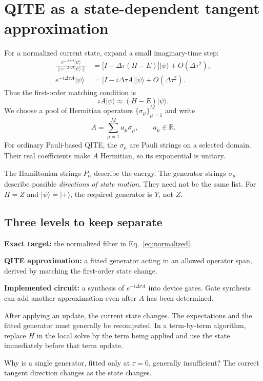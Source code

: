 \documentclass[11pt,a4paper]{article}
\newcommand{\ket}[1]{\lvert #1\rangle}
\newcommand{\norm}[1]{\left\lVert #1\right\rVert}
\newcommand{\dt}{\Delta\tau}
\newcommand{\lesson}[2]{\clearpage\section{#1}\label{#2}}
\newcommand{\checkpoint}[1]{\begin{idea}[Pause and check]#1\end{idea}}
\begin{document}
\lesson{QITE as a state-dependent tangent approximation}{sec:basic}
For a normalized current state, expand a small imaginary-time step:
\begin{align*}
\frac{e^{-\dt H}\ket{\psi}}{\norm{e^{-\dt H}\ket{\psi}}}
&=\bigl[I-\dt(H-E)\bigr]\ket{\psi}+O(\dt^2),\\
e^{-i\dt A}\ket{\psi}
&=\bigl[I-i\dt A\bigr]\ket{\psi}+O(\dt^2).
\end{align*}
Thus the first-order matching condition is
\begin{equation}
\boxed{iA\ket{\psi}\approx(H-E)\ket{\psi}.}
\label{eq:tangent}
\end{equation}
We choose a pool of Hermitian operators $\{\sigma_\mu\}_{\mu=1}^{M}$ and write
\[
A=\sum_{\mu=1}^{M}a_\mu\sigma_\mu,\qquad a_\mu\in\mathbb R.
\]
For ordinary Pauli-based QITE, the $\sigma_\mu$ are Pauli strings on a selected domain. Their real coefficients make $A$ Hermitian, so its exponential is unitary.

\begin{idea}
The Hamiltonian strings $P_\alpha$ describe the energy. The generator strings $\sigma_\mu$ describe possible \emph{directions of state motion}. They need not be the same list. For $H=Z$ and $\ket{\psi}=\ket{+}$, the required generator is $Y$, not $Z$.
\end{idea}

\subsection*{Three levels to keep separate}
\textbf{Exact target:} the normalized filter in Eq.~\eqref{eq:normalized}.

\textbf{QITE approximation:} a fitted generator acting in an allowed operator span, derived by matching the first-order state change.

\textbf{Implemented circuit:} a synthesis of $e^{-i\dt A}$ into device gates. Gate synthesis can add another approximation even after $A$ has been determined.

After applying an update, the current state changes. The expectations and the fitted generator must generally be recomputed. In a term-by-term algorithm, replace $H$ in the local solve by the term being applied and use the state immediately before that term update.

\checkpoint{Why is a single generator, fitted only at $\tau=0$, generally insufficient? The correct tangent direction changes as the state changes.}
\end{document}
